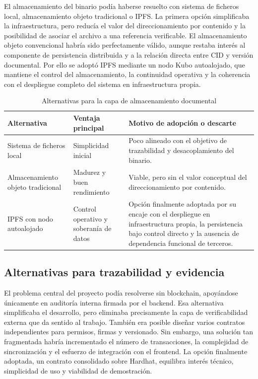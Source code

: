 \documentclass[11pt, a4paper]{article}
\begin{document}
El almacenamiento del binario podía haberse resuelto con sistema de ficheros local, almacenamiento objeto tradicional o IPFS. La primera opción simplificaba la infraestructura, pero reducía el valor del direccionamiento por contenido y la posibilidad de asociar el archivo a una referencia verificable. El almacenamiento objeto convencional habría sido perfectamente válido, aunque restaba interés al componente de persistencia distribuida y a la relación directa entre CID y versión documental. Por ello se adoptó IPFS mediante un nodo Kubo autoalojado, que mantiene el control del almacenamiento, la continuidad operativa y la coherencia con el despliegue completo del sistema en infraestructura propia.

\begin{table}[H]
    \centering
    \small
    \begin{tabular}{|p{3cm}|p{3.2cm}|p{6.7cm}|}
    \hline
    \textbf{Alternativa} & \textbf{Ventaja principal} & \textbf{Motivo de adopción o descarte} \\
    \hline
    Sistema de ficheros local & Simplicidad inicial & Poco alineado con el objetivo de trazabilidad y desacoplamiento del binario. \\
    \hline
    Almacenamiento objeto tradicional & Madurez y buen rendimiento & Viable, pero sin el valor conceptual del direccionamiento por contenido. \\
    \hline
    IPFS con nodo autoalojado & Control operativo y soberanía de datos & Opción finalmente adoptada por su encaje con el despliegue en infraestructura propia, la persistencia bajo control directo y la ausencia de dependencia funcional de terceros. \\
    \hline
    \end{tabular}
    \caption{Alternativas para la capa de almacenamiento documental}
    \label{tab:alternativas-almacenamiento}
\end{table}

\subsection{Alternativas para trazabilidad y evidencia}

El problema central del proyecto podía resolverse sin blockchain, apoyándose únicamente en auditoría interna firmada por el backend. Esa alternativa simplificaba el desarrollo, pero eliminaba precisamente la capa de verificabilidad externa que da sentido al trabajo. También era posible diseñar varios contratos independientes para permisos, firmas y versionado. Sin embargo, una solución tan fragmentada habría incrementado el número de transacciones, la complejidad de sincronización y el esfuerzo de integración con el frontend. La opción finalmente adoptada, un contrato consolidado sobre Hardhat, equilibra interés técnico, simplicidad de uso y viabilidad de demostración.
\end{document}
